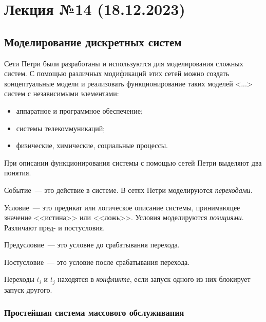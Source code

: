 \section{Лекция №14 (18.12.2023)}

\subsection{Моделирование дискретных систем}

Сети Петри были разработаны и используются для моделирования сложных систем. С помощью различных модификаций этих сетей можно создать концептуальные модели и реализовать функционирование таких моделей <...> систем с независимыми элементами:

\begin{itemize}
    \item аппаратное и программное обеспечение;
    \item системы телекоммуникаций;
    \item физические, химические, социальные процессы.
\end{itemize}

При описании функционирования системы с помощью сетей Петри выделяют два понятия.

\begin{dd}
    Событие~--- это действие в системе. В сетях Петри моделируются \textit{переходами}.
\end{dd}

\begin{dd}
    Условие~--- это предикат или логическое описание системы, принимающее значение <<истина>> или <<ложь>>. Условия моделируются \textit{позициями}. Различают пред- и постусловия.
\end{dd}

\begin{dd}
    Предусловие~--- это условие до срабатывания перехода.
\end{dd}

\begin{dd}
    Постусловие~--- это условие после срабатывания перехода.
\end{dd}

\begin{dd}
    Переходы $t_i$ и $t_j$ находятся в \textit{конфликте}, если запуск одного из них блокирует запуск другого.
\end{dd}

\subsubsection{Простейшая система массового обслуживания}

